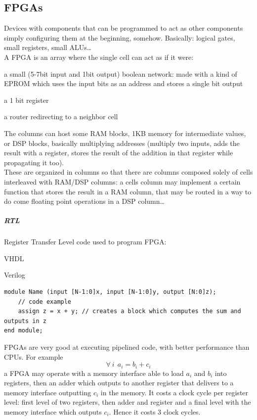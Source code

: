 \documentclass[10pt]{report}
\begin{document}
\subsection{FPGAs}
Devices with components that can be programmed to act as other components simply configuring them at the beginning, somehow. Basically: logical gates, small registers, small ALUs\ldots\\
A FPGA is an array where the single cell can act as if it were:
\begin{list}{}{}
	\item a small (5-7bit input and 1bit output) boolean network: made with a kind of EPROM which uses the input bits as an address and stores a single bit output
	\item a 1 bit register
	\item a router redirecting to a neighbor cell
\end{list}
The columns can host some RAM blocks, 1KB memory for intermediate values, or DSP blocks, basically multiplying addresses (multiply two inputs, adds the result with a register, stores the result of the addition in that register while propagating it too).\\
These are organized in columns so that there are columns composed solely of cells interleaved with RAM/DSP columns: a cells column may implement a certain function that stores the result in a RAM column, that may be routed in a way to do come floating point operations in a DSP column\ldots
\subparagraph{RTL} Register Transfer Level code used to program FPGA:
\begin{list}{}{}
	\item VHDL
	\item Verilog 
	
\begin{lstlisting}
module Name (input [N-1:0]x, input [N-1:0]y, output [N:0]z);
	// code example
	assign z = x + y; // creates a block which computes the sum and outputs in z
end module;
\end{lstlisting}
\end{list}
FPGAs are very good at executing pipelined code, with better performance than CPUs. For example $$\forall\:i\:\:a_i = b_i + c_i$$
a FPGA may operate with a memory interface able to load $a_i$ and $b_i$ into registers, then an adder which outputs to another register that delivers to a memory interface outputting $c_i$ in the memory. It costs a clock cycle per register level: first level of two registers, then adder and register and a final level with the memory interface which outputs $c_i$. Hence it costs 3 clock cycles.\\
\end{document}
